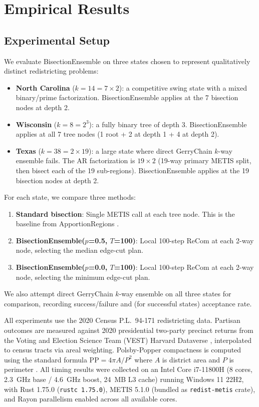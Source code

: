 \section{Empirical Results}
\label{sec:results}

\subsection{Experimental Setup}
\label{sec:results:setup}

We evaluate BisectionEnsemble on three states chosen to represent qualitatively
distinct redistricting problems:
\begin{itemize}
  \item \textbf{North Carolina} ($k=14 = 7 \times 2$): a competitive swing state
        with a mixed binary/prime factorization. BisectionEnsemble applies at the
        7 bisection nodes at depth 2.
  \item \textbf{Wisconsin} ($k=8 = 2^3$): a fully binary tree of depth 3.
        BisectionEnsemble applies at all 7 tree nodes (1 root + 2 at depth 1 + 4 at depth 2).
  \item \textbf{Texas} ($k=38 = 2 \times 19$): a large state where direct
        GerryChain $k$-way ensemble fails. The AR factorization is $19 \times 2$
        (19-way primary METIS split, then bisect each of the 19 sub-regions).
        BisectionEnsemble applies at the 19 bisection nodes at depth 2.
\end{itemize}

For each state, we compare three methods:
\begin{enumerate}
  \item \textbf{Standard bisection}: Single METIS call at each tree node.
        This is the baseline from ApportionRegions \citep{dellaLibera2026apportion}.
  \item \textbf{BisectionEnsemble($p$=0.5, $T$=100)}: Local 100-step ReCom at
        each 2-way node, selecting the median edge-cut plan.
  \item \textbf{BisectionEnsemble($p$=0.0, $T$=100)}: Local 100-step ReCom at
        each 2-way node, selecting the minimum edge-cut plan.
\end{enumerate}
We also attempt direct GerryChain $k$-way ensemble on all three states for
comparison, recording success/failure and (for successful states) acceptance rate.

All experiments use the 2020 Census P.L.~94-171 redistricting data.
Partisan outcomes are measured against 2020 presidential two-party precinct
returns from the Voting and Election Science Team (VEST) Harvard Dataverse
\citep{vest2020}, interpolated to census tracts via areal weighting.
Polsby-Popper compactness is computed using the standard formula
$\text{PP} = 4\pi A / P^2$ where $A$ is district area and $P$ is perimeter
\citep{polsby1991third}.
All timing results were collected on an Intel Core i7-11800H (8 cores,
2.3~GHz base / 4.6~GHz boost, 24~MB L3 cache) running Windows 11 22H2,
with Rust 1.75.0 (\texttt{rustc 1.75.0}), METIS 5.1.0 (bundled as
\texttt{redist-metis} crate), and Rayon parallelism enabled across all available cores.

